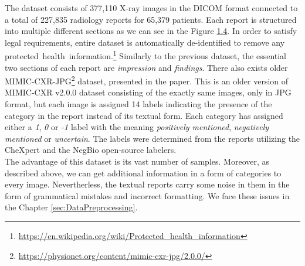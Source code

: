 The dataset consists of 377,110 X-ray images in the DICOM format connected to a total of 227,835 radiology reports for 65,379 patients. Each report is structured into multiple different sections as we can see in the Figure \hyperref[fig04:MimicCXRSample]{1.4}. In order to satisfy legal requirements, entire dataset is automatically de-identified to remove any protected~health~information.\footnote[9]{\url{https://en.wikipedia.org/wiki/Protected\_health\_information}} Similarly to the previous dataset, the essential two sections of each report are \textit{impression} and \textit{findings}. There also exists older MIMIC-CXR-JPG\footnote[10]{\url{https://physionet.org/content/mimic-cxr-jpg/2.0.0/}} dataset, presented in the \citet{cxr-jpg:johnson2019mimic} paper. This is an older version of MIMIC-CXR v2.0.0 dataset consisting of the exactly same images, only in JPG format, but each image is assigned 14 labels indicating the presence of the category in the report instead of its textual form. Each category has assigned either a \textit{1}, \textit{0} or \textit{-1} label with the meaning \textit{positively mentioned}, \textit{negatively mentioned} or \textit{uncertain}. The labels were determined from the reports utilizing the CheXpert\citep{irvin2019chexpert} and the NegBio\citep{peng2018negbio} open-source labelers.\\

The advantage of this dataset is its vast number of samples. Moreover, as described above, we can get additional information in a form of categories to every image. Nevertherless, the textual reports carry some noise in them in the form of grammatical mistakes and incorrect formatting. We face these issues in the Chapter \ref{sec:DataPreprocessing}. 

